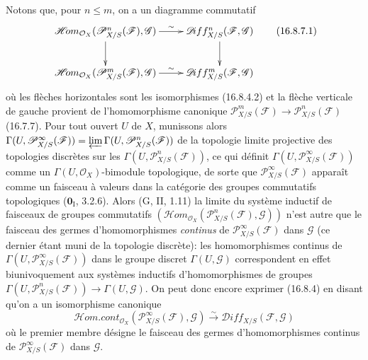 \begin{env}[16.8.7]
Notons que, pour $n\leq m$, on a un diagramme commutatif
\[
  \xymatrix{
    \mathscr{H}\!om_{\mathcal{O}_X}
      (\mathscr{P}_{X/S}^n(\mathscr{F}),\mathscr{G})
      \ar[r]^-{\sim}\ar[d]
      &\mathscr{D}\!iff_{X/S}^n(\mathscr{F},\mathscr{G})\ar[d]\\
    \mathscr{H}\!om_{\mathcal{O}_X}
      (\mathscr{P}_{X/S}^m(\mathscr{F}),\mathscr{G})
      \ar[r]^-{\sim}
      &\mathscr{D}\!iff_{X/S}^m(\mathscr{F},\mathscr{G})
  }
  \tag{16.8.7.1}
  \label{IV.16.8.7.1}
\]
où les flèches horizontales sont les isomorphismes (16.8.4.2) et la flèche
verticale de gauche provient de l'homomorphisme canonique
$\mathscr{P}_{X/S}^m(\mathscr{F})\to
\mathscr{P}_{X/S}^n(\mathscr{F})$ (16.7.7). Pour tout ouvert $U$ de $X$,
munissons alors
$\Gamma(U,\mathscr{P}_{X/S}^{\infty}(\mathscr{F}))=\varprojlim\Gamma(U,\mathscr{P}_{X/S}^n(\mathscr{F}))$
de la topologie limite projective des topologies discrètes sur les
$\Gamma(U,\mathscr{P}_{X/S}^n(\mathscr{F}))$, ce qui définit
$\Gamma(U,\mathscr{P}_{X/S}^{\infty}(\mathscr{F}))$ comme un
$\Gamma(U,\mathcal{O}_X)$-bimodule topologique, de sorte que
$\mathscr{P}_{X/S}^{\infty}(\mathscr{F})$ apparaît comme un faisceau à valeurs
dans la catégorie des groupes commutatifs topologiques
($\mathbf{0}_{\mathrm I}$, 3.2.6). Alors (G, II, 1.11) la limite du système inductif
de faisceaux de groupes commutatifs
$(\mathscr{H}\!om_{\mathcal{O}_X}(\mathscr{P}_{X/S}^n(\mathscr{F}),\mathscr{G}))$
n'est autre que le faisceau des germes d'homomorphismes \emph{continus} de
$\mathscr{P}_{X/S}^{\infty}(\mathscr{F})$ dans $\mathscr{G}$ (ce dernier
étant muni de la topologie discrète): les homomorphismes continus de
$\Gamma(U,\mathscr{P}_{X/S}^{\infty}(\mathscr{F}))$ dans le groupe discret
$\Gamma(U,\mathscr{G})$ correspondent en effet biunivoquement aux systèmes
inductifs d'homomorphismes de groupes
$\Gamma(U,\mathscr{P}_{X/S}^n(\mathscr{F}))\to\Gamma(U,\mathscr{G})$. On peut
donc encore exprimer (16.8.4) en disant qu'on a un isomorphisme canonique
\[
  \mathscr{H}\!om.\mathit{cont}_{\mathcal{O}_X}
  (\mathscr{P}_{X/S}^{\infty}(\mathscr{F}),\mathscr{G})
  \xrightarrow{\sim}
  \mathscr{D}\!iff_{X/S}(\mathscr{F},\mathscr{G})
\]
où le premier membre désigne le faisceau des germes d'homomorphismes continus
de $\mathscr{P}_{X/S}^{\infty}(\mathscr{F})$ dans $\mathscr{G}$.
\end{env}

